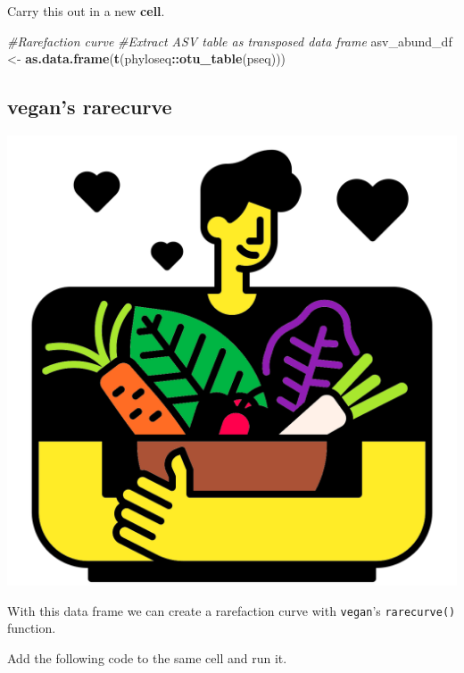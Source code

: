 \documentclass[
]{book}
\newenvironment{Shaded}{\begin{snugshade}}{\end{snugshade}}
\newcommand{\CommentTok}[1]{\textcolor[rgb]{0.56,0.35,0.01}{\textit{#1}}}
\newcommand{\FunctionTok}[1]{\textcolor[rgb]{0.13,0.29,0.53}{\textbf{#1}}}
\newcommand{\NormalTok}[1]{#1}
\newcommand{\OtherTok}[1]{\textcolor[rgb]{0.56,0.35,0.01}{#1}}
\newcommand{\SpecialCharTok}[1]{\textcolor[rgb]{0.81,0.36,0.00}{\textbf{#1}}}
\begin{document}
Carry this out in a new \textbf{cell}.

\begin{Shaded}
\begin{Highlighting}[]
\CommentTok{\#Rarefaction curve}
\CommentTok{\#Extract ASV table as transposed data frame}
\NormalTok{asv\_abund\_df }\OtherTok{\textless{}{-}} \FunctionTok{as.data.frame}\NormalTok{(}\FunctionTok{t}\NormalTok{(phyloseq}\SpecialCharTok{::}\FunctionTok{otu\_table}\NormalTok{(pseq)))}
\end{Highlighting}
\end{Shaded}

\hypertarget{vegans-rarecurve}{%
\subsection{vegan's rarecurve}\label{vegans-rarecurve}}

\includegraphics{figures/vegan.png}

With this data frame we can create a rarefaction curve with \texttt{vegan}'s \texttt{rarecurve()} function.

Add the following code to the same cell and run it.
\end{document}
